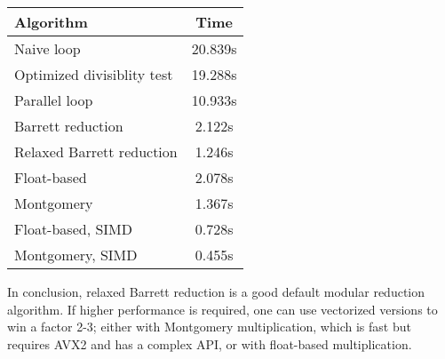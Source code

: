\vspace{1mm}
\noindent
\begin{tabular}{|l|c|}
\hline
Algorithm & Time \\
\hline
Naive loop & 20.839s \\
Optimized divisiblity test & 19.288s \\
Parallel loop & 10.933s \\
Barrett reduction & 2.122s \\
Relaxed Barrett reduction & 1.246s \\
Float-based & 2.078s \\
Montgomery & 1.367s \\
Float-based, SIMD & 0.728s \\
Montgomery, SIMD & 0.455s \\
\hline
\end{tabular}
\vspace{1mm}

\noindent
In conclusion, relaxed Barrett reduction is a good default modular reduction algorithm.
If higher performance is required, one can use vectorized versions to win a factor 2-3; either with
Montgomery multiplication, which is fast but requires AVX2 and has a complex API, or with
float-based multiplication.
